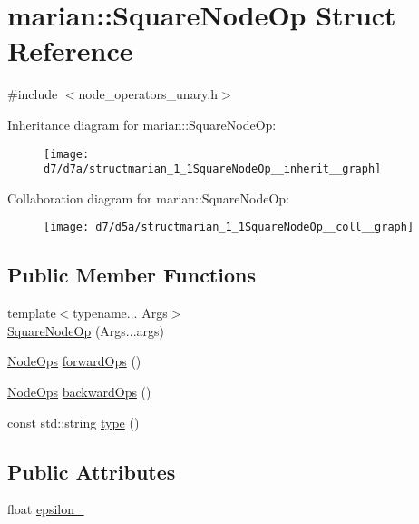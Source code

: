 \hypertarget{structmarian_1_1SquareNodeOp}{}\section{marian\+:\+:Square\+Node\+Op Struct Reference}
\label{structmarian_1_1SquareNodeOp}


{\ttfamily \#include $<$node\+\_\+operators\+\_\+unary.\+h$>$}



Inheritance diagram for marian\+:\+:Square\+Node\+Op\+:
\nopagebreak
\begin{figure}[H]
\begin{center}
\leavevmode
\texttt{[image: d7/d7a/structmarian\_1\_1SquareNodeOp\_\_inherit\_\_graph]}
\end{center}
\end{figure}


Collaboration diagram for marian\+:\+:Square\+Node\+Op\+:
\nopagebreak
\begin{figure}[H]
\begin{center}
\leavevmode
\texttt{[image: d7/d5a/structmarian\_1\_1SquareNodeOp\_\_coll\_\_graph]}
\end{center}
\end{figure}
\subsection*{Public Member Functions}
\begin{DoxyCompactItemize}
\item 
{\footnotesize template$<$typename... Args$>$ }\\\hyperlink{structmarian_1_1SquareNodeOp_aeede6c9b0492c91d0ff0973934161cd9}{Square\+Node\+Op} (Args...\+args)
\item 
\hyperlink{namespacemarian_a4956376218cc236016c20bc4071470da}{Node\+Ops} \hyperlink{structmarian_1_1SquareNodeOp_a9830637ea6eb13dfbadf8478e585049b}{forward\+Ops} ()
\item 
\hyperlink{namespacemarian_a4956376218cc236016c20bc4071470da}{Node\+Ops} \hyperlink{structmarian_1_1SquareNodeOp_acc9e02797b8bdbbb797033bc0712bee7}{backward\+Ops} ()
\item 
const std\+::string \hyperlink{structmarian_1_1SquareNodeOp_a1fecb17ca82abda65d0ff9b991221963}{type} ()
\end{DoxyCompactItemize}
\subsection*{Public Attributes}
\begin{DoxyCompactItemize}
\item 
float \hyperlink{structmarian_1_1SquareNodeOp_a47d7e1e8899790899124558cfdcacf20}{epsilon\+\_\+}
\end{DoxyCompactItemize}
